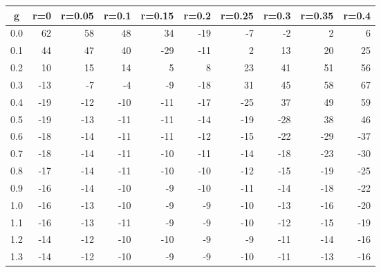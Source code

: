 %
\begin{table}[!tbp]
 \begin{center}
 \begin{tabular}{rrrrrrrrrr}\hline\hline
\multicolumn{1}{c}{g}&\multicolumn{1}{c}{r=0}&\multicolumn{1}{c}{r=0.05}&\multicolumn{1}{c}{r=0.1}&\multicolumn{1}{c}{r=0.15}&\multicolumn{1}{c}{r=0.2}&\multicolumn{1}{c}{r=0.25}&\multicolumn{1}{c}{r=0.3}&\multicolumn{1}{c}{r=0.35}&\multicolumn{1}{c}{r=0.4}\tabularnewline
\hline
0.0& 62& 58& 48& 34&-19& -7& -2&  2&  6\tabularnewline
0.1& 44& 47& 40&-29&-11&  2& 13& 20& 25\tabularnewline
0.2& 10& 15& 14&  5&  8& 23& 41& 51& 56\tabularnewline
0.3&-13& -7& -4& -9&-18& 31& 45& 58& 67\tabularnewline
0.4&-19&-12&-10&-11&-17&-25& 37& 49& 59\tabularnewline
0.5&-19&-13&-11&-11&-14&-19&-28& 38& 46\tabularnewline
0.6&-18&-14&-11&-11&-12&-15&-22&-29&-37\tabularnewline
0.7&-18&-14&-11&-10&-11&-14&-18&-23&-30\tabularnewline
0.8&-17&-14&-11&-10&-10&-12&-15&-19&-25\tabularnewline
0.9&-16&-14&-10& -9&-10&-11&-14&-18&-22\tabularnewline
1.0&-16&-13&-10& -9& -9&-10&-13&-16&-20\tabularnewline
1.1&-16&-13&-11& -9& -9&-10&-12&-15&-19\tabularnewline
1.2&-14&-12&-10&-10& -9& -9&-11&-14&-16\tabularnewline
1.3&-14&-12&-10& -9& -9&-10&-11&-13&-16\tabularnewline
\hline
\end{tabular}

\end{center}

\end{table}

